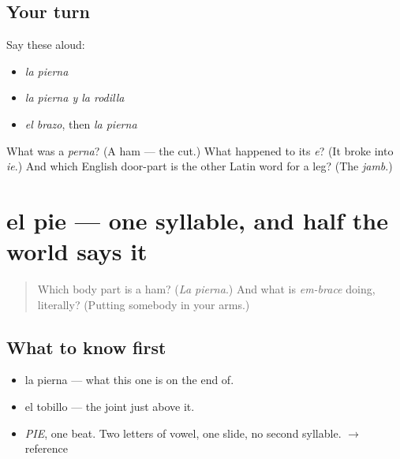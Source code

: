\subsection*{Your turn}
Say these aloud:

\begin{itemize}
\raggedright
  \item \emph{la pierna}
  \item \emph{la pierna y la rodilla}
  \item \emph{el brazo}, then \emph{la pierna}
\end{itemize}

\begin{tcolorbox}[breakable,colback=teal!4,colframe=teal!35!black,title={Before you move on}]
What was a \emph{perna}? (A ham — the cut.) What happened to its \emph{e}? (It broke into \emph{ie}.) And which English door-part is the other Latin word for a leg? (The \emph{jamb}.)
\end{tcolorbox}
\section[el pie]{el pie — one syllable, and half the world says it}

\label{lesson:ES-C314-pie}



\begin{quote}
Which body part is a ham? (\emph{La pierna}.) And what is \emph{em-brace} doing, literally? (Putting somebody in your arms.)
\end{quote}

\subsection*{What to know first}
\begin{itemize}
\raggedright
  \item la pierna — what this one is on the end of.
  \item el tobillo — the joint just above it.
\end{itemize}

\begin{sounds}
\begin{itemize}
\raggedright
  \item \emph{PIE}, one beat. Two letters of vowel, one slide, no second syllable. $\to$ reference
\end{itemize}
\end{sounds}

